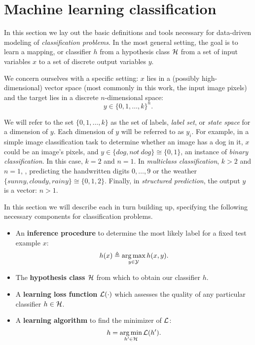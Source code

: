 \chapter{Machine learning classification}

In this section we lay out the basic definitions and tools necessary for 
data-driven modeling of {\em classification problems}.  In the most general 
setting, the goal is to learn a mapping, or classifier $h$ from a hypothesis 
class $\mathcal{H}$ from a set of input variables $x$ to a set of discrete output 
variables $y$.   

We concern ourselves with a specific setting: $x$ lies in a (possibly 
high-dimensional) vector space (most commonly in this work, the input image 
pixels) and the target lies in a discrete $n$-dimensional space: 
$$y \in \{0,1,\ldots,k\}^n.$$  

We will refer to the set $\{0,1,\ldots,k\}$ as the set of labels, {\em label 
set}, or {\em state space} for a dimension of $y$.  Each dimension of $y$ will 
be referred to as $y_i$.  For example, in a simple image classification task to 
determine whether an image has a dog in it, $x$ could be an image's pixels, and 
$y \in \{dog, not~dog\} \cong \{0,1\} $, an instance of {\em binary 
classification}. In this case, $k = 2$ and $n 
= 1$.  In {\em multiclass classification}, $k>2$ and $n = 1$, \eg, predicting 
the handwritten digits $0,\dots,9$ or the weather $\{sunny, cloudy, rainy\} 
\cong \{0,1,2\}$.  Finally, in {\em structured prediction}, the output $y$ is a 
vector: $n>1$.

In this section we will describe each in turn building up, specifying the 
following necessary components for classification problems.

\begin{itemize}
\item An {\bf inference procedure} to determine the most likely label for a 
fixed test example $x$: \begin{equation}
h(x) \triangleq \mathop{\arg\max}_{y \in \mathcal{Y}} h(x,y).
\end{equation}
\item The {\bf hypothesis class $\mathcal{H}$} from which to obtain our classifier $h$.
\item  A {\bf learning loss function} $\mathcal{L}(\cdot)$ which assesses the quality 
of any particular classifier $h \in \mathcal{H}$.
\item A {\bf learning algorithm} to find the minimizer of $\mathcal{L}$: 
\begin{equation}
h = \mathop{\arg\min}_{h' \in \mathcal{H}} \mathcal{L}(h').
\end{equation}
\end{itemize}

